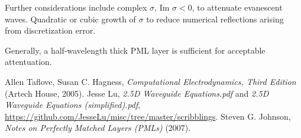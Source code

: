 \documentclass{article}
\begin{document}
Further considerations include complex $\sigma$, $\text{Im }\sigma < 0$, to attenuate evanescent waves. Quadratic or cubic growth of $\sigma$ to reduce numerical reflections arising from discretization error. 

Generally, a half-wavelength thick PML layer is sufficient for acceptable attentuation.

\begin{thebibliography}{99}
 Allen Taflove, Susan C. Hagness, \emph{Computational Electrodynamics, Third Edition} (Artech House, 2005). 
 Jesse Lu, \emph{2.5D Waveguide Equations.pdf} and \emph{2.5D Waveguide Equations (simplified).pdf}, \url{https://github.com/JesseLu/misc/tree/master/scribblings}.
 Steven G. Johnson, \emph{Notes on Perfectly Matched Layers (PMLs)} (2007).
\end{thebibliography}
\end{document}
